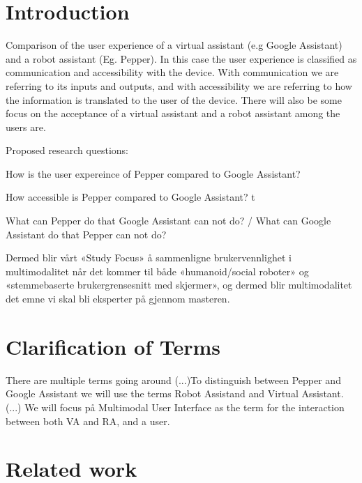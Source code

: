 \section{Introduction}
Comparison of the user experience of a virtual assistant (e.g Google Assistant) and a robot assistant (Eg. Pepper). In this case the user experience is classified as communication and accessibility with the device. With communication we are referring to its inputs and outputs, and with accessibility we are referring to how the information is translated to the user of the device. There will also be some focus on the acceptance of a virtual assistant and a robot assistant among the users are.

Proposed research questions: 

How is the user expereince of Pepper compared to Google Assistant? 

How accessible is Pepper compared to Google Assistant?  t

What can Pepper do that Google Assistant can not do? / What can Google Assistant do that Pepper can not do? 

Dermed blir vårt «Study Focus» å sammenligne brukervennlighet i multimodalitet når det kommer til både «humanoid/social roboter» og «stemmebaserte brukergrensesnitt med skjermer», og dermed blir multimodalitet det emne vi skal bli eksperter på gjennom masteren.

\section{Clarification of Terms}
There are multiple terms going around (...)To distinguish between Pepper and Google Assistant we will use the terms Robot Assistand and Virtual Assistant. (...) We will focus på Multimodal User Interface as the term for the interaction between both VA and RA, and a user.

\section{Related work}

